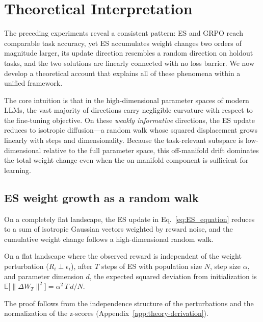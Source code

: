 \section{Theoretical Interpretation}
\label{sec:theory}
 
The preceding experiments reveal a consistent pattern: ES and GRPO reach comparable task accuracy, yet ES accumulates weight changes two orders of magnitude larger, its update direction resembles a random direction on holdout tasks, and the two solutions are linearly connected with no loss barrier. We now develop a theoretical account that explains all of these phenomena within a unified framework.
 
The core intuition is that in the high-dimensional parameter spaces of modern LLMs, the vast majority of directions carry negligible curvature with respect to the fine-tuning objective. On these \emph{weakly informative} directions, the ES update reduces to isotropic diffusion—a random walk whose squared displacement grows linearly with steps and dimensionality. Because the task-relevant subspace is low-dimensional relative to the full parameter space, this off-manifold drift dominates the total weight change even when the on-manifold component is sufficient for learning.
 
\subsection{ES weight growth as a random walk}
 
On a completely flat landscape, the ES update in Eq.~\eqref{eq:ES_equation} reduces to a sum of isotropic Gaussian vectors weighted by reward noise, and the cumulative weight change follows a high-dimensional random walk.
 
\begin{proposition}
\label{prop:flat}
On a flat landscape where the observed reward is independent of the weight perturbation ($R_i \perp \epsilon_i$), after $T$ steps of ES with population size $N$, step size $\alpha$, and parameter dimension $d$, the expected squared deviation from initialization is
$\mathbb{E}\bigl[\|\Delta W_T\|^{2}\bigr] = {\alpha^{2}\, T\, d}/{N}.$
\end{proposition}
 
\noindent The proof follows from the independence structure of the perturbations and the normalization of the z-scores (Appendix~\ref{app:theory-derivation}).
 
